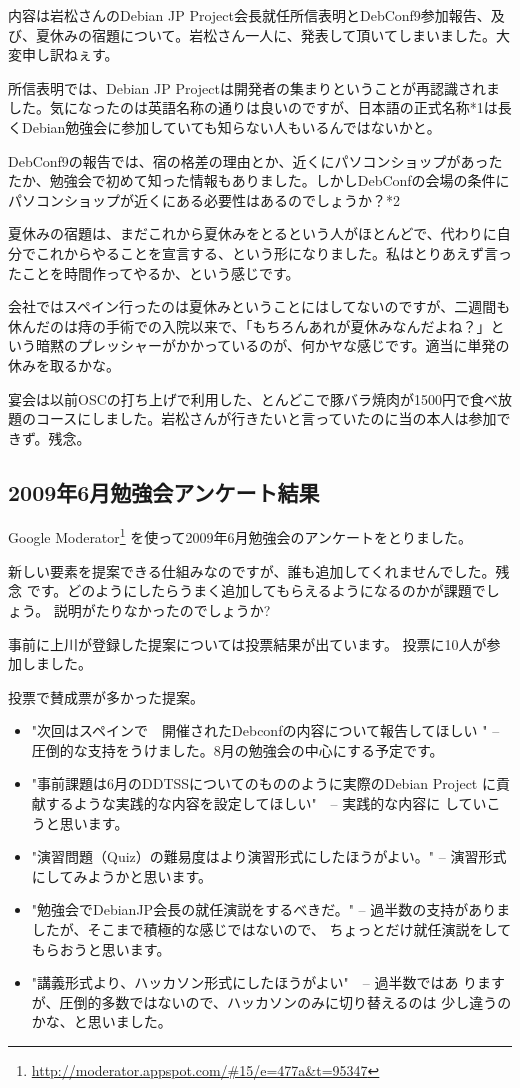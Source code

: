\documentclass[mingoth,a4paper]{jsarticle}
\begin{document}
内容は岩松さんのDebian JP Project会長就任所信表明とDebConf9参加報告、及び、夏休みの宿題について。岩松さん一人に、発表して頂いてしまいました。大変申し訳ねぇす。

所信表明では、Debian JP Projectは開発者の集まりということが再認識されました。気になったのは英語名称の通りは良いのですが、日本語の正式名称*1は長くDebian勉強会に参加していても知らない人もいるんではないかと。

DebConf9の報告では、宿の格差の理由とか、近くにパソコンショップがあったたか、勉強会で初めて知った情報もありました。しかしDebConfの会場の条件にパソコンショップが近くにある必要性はあるのでしょうか？*2

夏休みの宿題は、まだこれから夏休みをとるという人がほとんどで、代わりに自分でこれからやることを宣言する、という形になりました。私はとりあえず言ったことを時間作ってやるか、という感じです。

会社ではスペイン行ったのは夏休みということにはしてないのですが、二週間も休んだのは痔の手術での入院以来で、「もちろんあれが夏休みなんだよね？」という暗黙のプレッシャーがかかっているのが、何かヤな感じです。適当に単発の休みを取るかな。

宴会は以前OSCの打ち上げで利用した、とんどこで豚バラ焼肉が1500円で食べ放題のコースにしました。岩松さんが行きたいと言っていたのに当の本人は参加できず。残念。

\subsection{2009年6月勉強会アンケート結果}

Google
 Moderator\footnote{\url{http://moderator.appspot.com/\#15/e=477a&t=95347}}
 を使って2009年6月勉強会のアンケートをとりました。

新しい要素を提案できる仕組みなのですが、誰も追加してくれませんでした。残念
です。どのようにしたらうまく追加してもらえるようになるのかが課題でしょう。
説明がたりなかったのでしょうか?

事前に上川が登録した提案については投票結果が出ています。
投票に10人が参加しました。

投票で賛成票が多かった提案。

\begin{itemize}
 \item  "次回はスペインで　開催されたDebconfの内容について報告してほしい
	" -- 圧倒的な支持をうけました。8月の勉強会の中心にする予定です。
 \item  "事前課題は6月のDDTSSについてのもののように実際のDebian Project
	に貢献するような実践的な内容を設定してほしい"　-- 実践的な内容に
	していこうと思います。
 \item  "演習問題（Quiz）の難易度はより演習形式にしたほうがよい。"
	-- 演習形式にしてみようかと思います。
 \item  "勉強会でDebianJP会長の就任演説をするべきだ。"
	-- 過半数の支持がありましたが、そこまで積極的な感じではないので、
	ちょっとだけ就任演説をしてもらおうと思います。
 \item  "講義形式より、ハッカソン形式にしたほうがよい"　-- 過半数ではあ
	りますが、圧倒的多数ではないので、ハッカソンのみに切り替えるのは
	少し違うのかな、と思いました。
\end{itemize} 	
\end{document}
